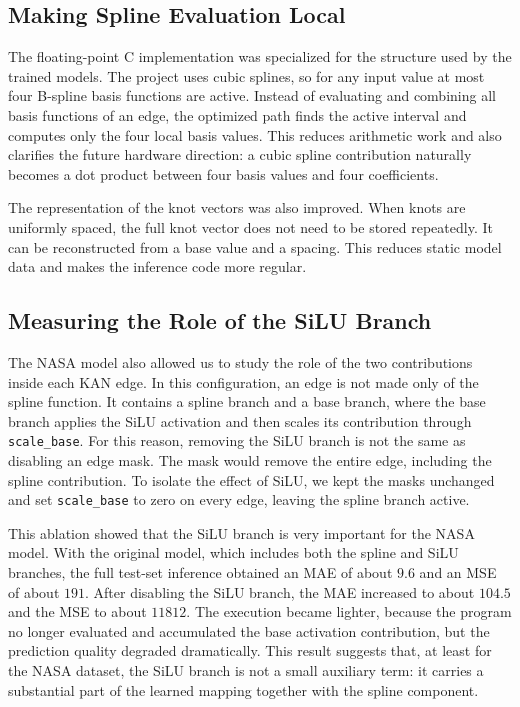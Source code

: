 \documentclass[11pt,a4paper]{article}
\begin{document}
\subsection{Making Spline Evaluation Local}

The floating-point C implementation was specialized for the structure used by the trained models.
The project uses cubic splines, so for any input value at most four B-spline basis functions are active.
Instead of evaluating and combining all basis functions of an edge, the optimized path finds the active interval and computes only the four local basis values.
This reduces arithmetic work and also clarifies the future hardware direction: a cubic spline contribution naturally becomes a dot product between four basis values and four coefficients.

The representation of the knot vectors was also improved.
When knots are uniformly spaced, the full knot vector does not need to be stored repeatedly.
It can be reconstructed from a base value and a spacing.
This reduces static model data and makes the inference code more regular.

\subsection{Measuring the Role of the SiLU Branch}

The NASA model also allowed us to study the role of the two contributions inside each KAN edge.
In this configuration, an edge is not made only of the spline function.
It contains a spline branch and a base branch, where the base branch applies the SiLU activation and then scales its contribution through \texttt{scale\_base}.
For this reason, removing the SiLU branch is not the same as disabling an edge mask.
The mask would remove the entire edge, including the spline contribution.
To isolate the effect of SiLU, we kept the masks unchanged and set \texttt{scale\_base} to zero on every edge, leaving the spline branch active.

This ablation showed that the SiLU branch is very important for the NASA model.
With the original model, which includes both the spline and SiLU branches, the full test-set inference obtained an MAE of about $9.6$ and an MSE of about $191$.
After disabling the SiLU branch, the MAE increased to about $104.5$ and the MSE to about $11812$.
The execution became lighter, because the program no longer evaluated and accumulated the base activation contribution, but the prediction quality degraded dramatically.
This result suggests that, at least for the NASA dataset, the SiLU branch is not a small auxiliary term: it carries a substantial part of the learned mapping together with the spline component.
\end{document}
